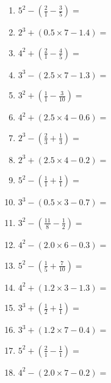 \documentclass[12pt]{article}
\begin{document}
\begin{enumerate}
\item \large $ 5^{2} - (\frac{2}{1} - \frac{3}{5}) = $ \vspace{1.6cm}
\item \large $ 2^{3} + (0.5 \times 7 - 1.4) = $ \vspace{1.6cm}
\item \large $ 4^{2} + (\frac{2}{1} - \frac{4}{5}) = $ \vspace{1.6cm}
\item \large $ 3^{3} - (2.5 \times 7 - 1.3) = $ \vspace{1.6cm}
\newpage
\item \large $ 3^{2} + (\frac{1}{1} - \frac{3}{10}) = $ \vspace{1.6cm}
\item \large $ 4^{2} + (2.5 \times 4 - 0.6) = $ \vspace{1.6cm}
\item \large $ 2^{3} - (\frac{2}{3} + \frac{1}{3}) = $ \vspace{1.6cm}
\item \large $ 2^{3} + (2.5 \times 4 - 0.2) = $ \vspace{1.6cm}
\item \large $ 5^{2} - (\frac{1}{1} + \frac{1}{1}) = $ \vspace{1.6cm}
\item \large $ 3^{3} - (0.5 \times 3 - 0.7) = $ \vspace{1.6cm}
\item \large $ 3^{2} - (\frac{11}{8} - \frac{1}{2}) = $ \vspace{1.6cm}
\item \large $ 4^{2} - (2.0 \times 6 - 0.3) = $ \vspace{1.6cm}
\item \large $ 5^{2} - (\frac{1}{5} + \frac{7}{10}) = $ \vspace{1.6cm}
\item \large $ 4^{2} + (1.2 \times 3 - 1.3) = $ \vspace{1.6cm}
\newpage
\item \large $ 3^{3} + (\frac{1}{2} + \frac{1}{1}) = $ \vspace{1.6cm}
\item \large $ 3^{3} + (1.2 \times 7 - 0.4) = $ \vspace{1.6cm}
\item \large $ 5^{2} + (\frac{2}{1} - \frac{1}{1}) = $ \vspace{1.6cm}
\item \large $ 4^{2} - (2.0 \times 7 - 0.2) = $ \vspace{1.6cm}

\end{enumerate}
\end{document}
